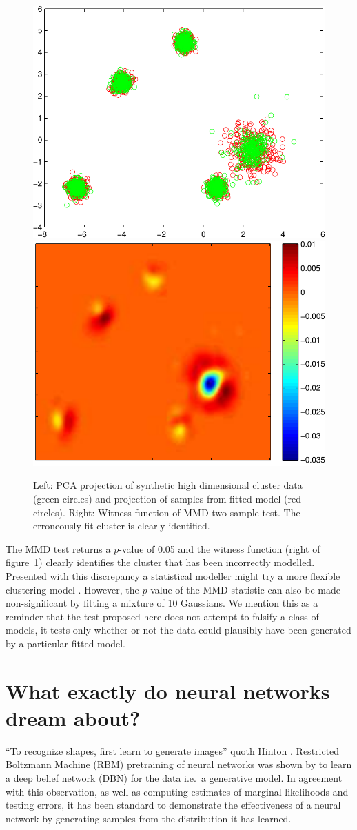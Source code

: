 \documentclass{article} %
\def\ie{i.e.\ }
\begin{document}
\begin{figure}[ht]
\centering
\includegraphics[width=0.3\columnwidth]{figures/high_mog_pca}
\hspace{0.1\columnwidth}
\includegraphics[width=0.31\columnwidth]{figures/high_mog_witness}
\caption{
Left: PCA projection of synthetic high dimensional cluster data (green circles) and projection of samples from fitted model (red circles).
Right: Witness function of MMD two sample test. The erroneously fit cluster is clearly identified.
}
\label{fig:high_mog}
\end{figure}

The MMD test returns a $p$-value of 0.05 and the witness function (right of figure~\ref{fig:high_mog}) clearly identifies the cluster that has been incorrectly modelled.
Presented with this discrepancy a statistical modeller might try a more flexible clustering model \citep[e.g.][]{Peel2000-pv, Iwata2012-yj}.
However, the $p$-value of the MMD statistic can also be made non-significant by fitting a mixture of 10 Gaussians.
We mention this as a reminder that the test proposed here does not attempt to falsify a class of models, it tests only whether or not the data could plausibly have been generated by a particular fitted model.

\section{What exactly do neural networks dream about?}

``To recognize shapes, first learn to generate images'' quoth Hinton \citep{Hinton2007-eo}.
Restricted Boltzmann Machine (RBM) pretraining of neural networks was shown by \cite{Hinton2006-yw} to learn a deep belief network (DBN) for the data \ie a generative model.
In agreement with this observation, as well as computing estimates of marginal likelihoods and testing errors, it has been standard to demonstrate the effectiveness of a neural network by generating samples from the distribution it has learned.
\end{document}
